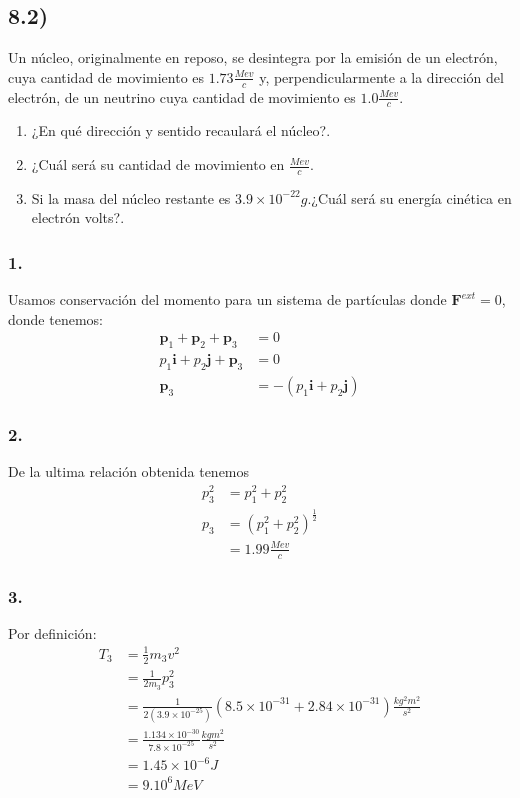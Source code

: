 \documentclass{article}
\begin{document}
\subsection*{8.2)}
Un núcleo, originalmente en reposo, se desintegra por la emisión de un electrón, cuya 
cantidad de movimiento es $1.73 \frac{Mev}{c}$ y, perpendicularmente a la dirección del
electrón, de un neutrino cuya cantidad de movimiento es $1.0\frac{Mev}{c}$. 
\begin{enumerate}
    \item ¿En qué dirección y sentido recaulará el núcleo?.
    \item ¿Cuál será su cantidad de movimiento en $\frac{Mev}{c}$. 
    \item Si la masa del núcleo restante es $3.9 \times 10^{-22}g$.¿Cuál será su energía cinética en electrón volts?. 
\end{enumerate}
\begin{tcolorbox}[breakable]
    \subsubsection*{1.}
    Usamos conservación del momento para un sistema de partículas donde $\bm{F}^{ext} = 0$, donde tenemos:
    \begin{align*}
        \bm{p}_1 + \bm{p}_2 + \bm{p}_3 &= 0 \\
        p_1\bm{i} + p_2\bm{j} + \bm{p}_3 &= 0 \\
        \bm{p}_3 &= -(p_1\bm{i} + p_2\bm{j})
    \end{align*}
    \subsubsection*{2.}
    De la ultima relación obtenida tenemos
    \begin{align*}
        p_3^2 &= p_1^2 + p_2^2 \\
        p_3 
        &= (p_1^2+p_2^2)^{\frac{1}{2}} \\
        &= 1.99 \frac{Mev}{c}  
    \end{align*}
    \subsubsection*{3.}
    Por definición:
    \begin{align*}
        T_3 
        &= \frac{1}{2}m_3v^2 \\
        &= \frac{1}{2m_3}p_3^2 \\
        &= \frac{1}{2(3.9 \times 10^{-25})}(8.5 \times 10^{-31} + 2.84 \times 10^{-31}) \frac{kg^2m^2}{s^2} \\
        &= \frac{1.134 \times 10^{-30}}{7.8 \times 10^{-25}} \frac{kgm^2}{s^2} \\
        &= 1.45 \times 10^{-6}J \\
        &= 9.10^6 MeV
    \end{align*}
\end{tcolorbox}
\end{document}
